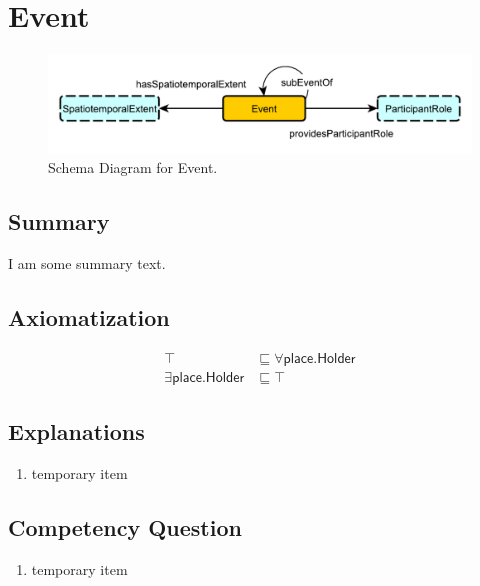 \section{Event}
\label{sec:Event}
\begin{figure}[h!]
\begin{center}
\includegraphics[width=.4\textwidth]{figures/event}
\end{center}
\caption{Schema Diagram for Event.}
\label{fig:Event}
\end{figure}
\subsection{Summary}
\label{sum:Event}
I am some summary text.

\subsection{Axiomatization}
\label{axs:Event}
\begin{align}
\top &\sqsubseteq \forall\textsf{place.Holder} \\ 
\exists\textsf{place.Holder} &\sqsubseteq \top 
\end{align}

\subsection{Explanations}
\label{exp:Event}
\begin{enumerate}
\item temporary item
\end{enumerate}

\subsection{Competency Question}
\label{cqs:Event}
\begin{enumerate}[CQ1.]
\item temporary item
\end{enumerate}

\newpage

